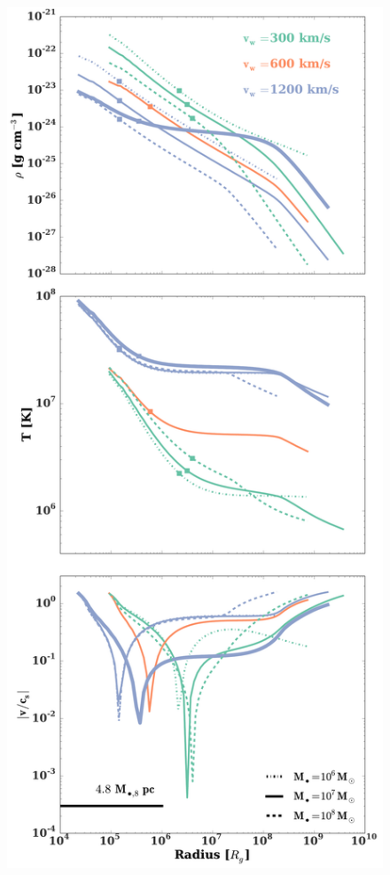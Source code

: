 \documentclass[usenatbib,fleqn]{mn2e}
\begin{document}
\begin{figure}
  \includegraphics[width=\columnwidth]{profiles.pdf}

\end{figure}
\end{document}
